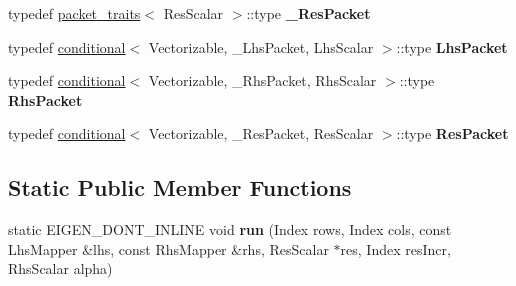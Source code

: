 \begin{DoxyCompactItemize}
\item 
\mbox{\label{struct_eigen_1_1internal_1_1general__matrix__vector__product_3_01_index_00_01_lhs_scalar_00_01_l2767aff966c7bf3a7d425c9d340a95e8_a8142b0be9bd30897df43086a04de7daa}} 
typedef \mbox{\hyperlink{struct_eigen_1_1internal_1_1packet__traits}{packet\+\_\+traits}}$<$ Res\+Scalar $>$\+::type {\bfseries \+\_\+\+Res\+Packet}
\item 
\mbox{\label{struct_eigen_1_1internal_1_1general__matrix__vector__product_3_01_index_00_01_lhs_scalar_00_01_l2767aff966c7bf3a7d425c9d340a95e8_a379c7df75eb3851255d30c90b2366c4e}} 
typedef \mbox{\hyperlink{struct_eigen_1_1internal_1_1conditional}{conditional}}$<$ Vectorizable, \+\_\+\+Lhs\+Packet, Lhs\+Scalar $>$\+::type {\bfseries Lhs\+Packet}
\item 
\mbox{\label{struct_eigen_1_1internal_1_1general__matrix__vector__product_3_01_index_00_01_lhs_scalar_00_01_l2767aff966c7bf3a7d425c9d340a95e8_afc371cf74be3920219cc57298f82e780}} 
typedef \mbox{\hyperlink{struct_eigen_1_1internal_1_1conditional}{conditional}}$<$ Vectorizable, \+\_\+\+Rhs\+Packet, Rhs\+Scalar $>$\+::type {\bfseries Rhs\+Packet}
\item 
\mbox{\label{struct_eigen_1_1internal_1_1general__matrix__vector__product_3_01_index_00_01_lhs_scalar_00_01_l2767aff966c7bf3a7d425c9d340a95e8_abe1e9aa6cefa67d0062813aff21e6ac0}} 
typedef \mbox{\hyperlink{struct_eigen_1_1internal_1_1conditional}{conditional}}$<$ Vectorizable, \+\_\+\+Res\+Packet, Res\+Scalar $>$\+::type {\bfseries Res\+Packet}
\end{DoxyCompactItemize}
\subsection*{Static Public Member Functions}
\begin{DoxyCompactItemize}
\item 
\mbox{\label{struct_eigen_1_1internal_1_1general__matrix__vector__product_3_01_index_00_01_lhs_scalar_00_01_l2767aff966c7bf3a7d425c9d340a95e8_a8b2829241d86c85f39e2c559d9e77507}} 
static E\+I\+G\+E\+N\+\_\+\+D\+O\+N\+T\+\_\+\+I\+N\+L\+I\+NE void {\bfseries run} (Index rows, Index cols, const Lhs\+Mapper \&lhs, const Rhs\+Mapper \&rhs, Res\+Scalar $\ast$res, Index res\+Incr, Rhs\+Scalar alpha)
\end{DoxyCompactItemize}


